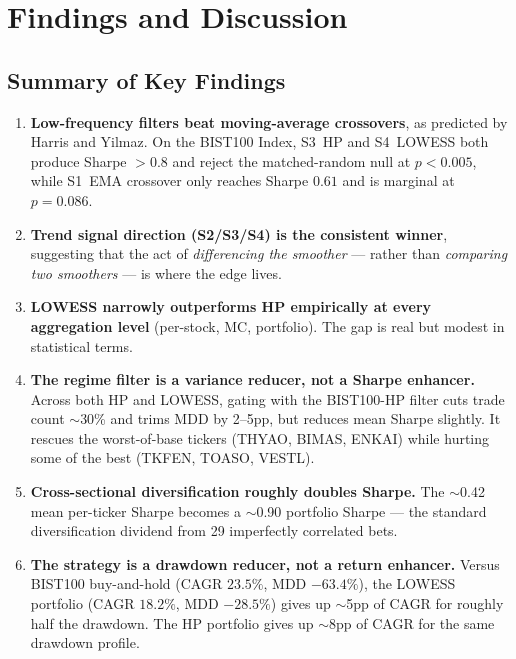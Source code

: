 \documentclass[11pt,a4paper]{article}
\begin{document}
\section{Findings and Discussion}

\subsection{Summary of Key Findings}

\begin{enumerate}[leftmargin=1.5em,itemsep=4pt]

\item \textbf{Low-frequency filters beat moving-average crossovers}, as
predicted by Harris and Yilmaz. On the BIST100 Index, S3~HP and S4~LOWESS
both produce Sharpe $>0.8$ and reject the matched-random null at $p<0.005$,
while S1~EMA crossover only reaches Sharpe $0.61$ and is marginal at $p=0.086$.

\item \textbf{Trend signal direction (S2/S3/S4) is the consistent winner},
suggesting that the act of \emph{differencing the smoother} --- rather than
\emph{comparing two smoothers} --- is where the edge lives.

\item \textbf{LOWESS narrowly outperforms HP empirically at every aggregation
level} (per-stock, MC, portfolio). The gap is real but modest in statistical
terms.

\item \textbf{The regime filter is a variance reducer, not a Sharpe
enhancer.} Across both HP and LOWESS, gating with the BIST100-HP filter
cuts trade count $\sim$30\% and trims MDD by 2--5pp, but reduces mean Sharpe
slightly. It rescues the worst-of-base tickers (THYAO, BIMAS, ENKAI) while
hurting some of the best (TKFEN, TOASO, VESTL).

\item \textbf{Cross-sectional diversification roughly doubles Sharpe.} The
$\sim$0.42 mean per-ticker Sharpe becomes a $\sim$0.90 portfolio Sharpe ---
the standard diversification dividend from 29 imperfectly correlated bets.

\item \textbf{The strategy is a drawdown reducer, not a return enhancer.}
Versus BIST100 buy-and-hold (CAGR $23.5\%$, MDD $-63.4\%$), the LOWESS
portfolio (CAGR $18.2\%$, MDD $-28.5\%$) gives up $\sim$5pp of CAGR for
roughly half the drawdown. The HP portfolio gives up $\sim$8pp of CAGR for
the same drawdown profile.


\end{enumerate}
\end{document}
